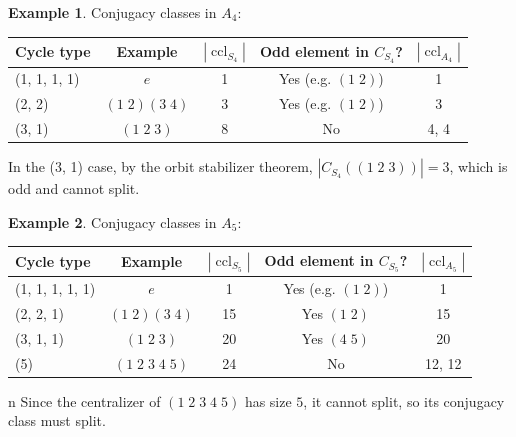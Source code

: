 \documentclass[a4paper]{article}
\theoremstyle{definition}
\newtheorem*{eg}{Example}
\DeclareMathOperator\ccl{ccl}
\begin{document}
\begin{eg}
  Conjugacy classes in $A_4$:\vspace{4pt}                                                         \\
  \begin{tabular}{lcccc}
    \toprule
    Cycle type   & Example          & $|\ccl_{S_4}|$ & Odd element in $C_{S_4}$? & $|\ccl_{A_4}|$ \\
    \midrule
    (1, 1, 1, 1) & $e$              & 1              & Yes (e.g. $(1\; 2)$)      & 1              \\
    (2, 2)       & $(1\; 2)(3\; 4)$ & 3              & Yes (e.g. $(1\; 2)$)      & 3              \\
    (3, 1)       & $(1\; 2\; 3)$    & 8              & No                        & 4, 4           \\
    \bottomrule
  \end{tabular}

  \vspace{4pt}
  \noindent In the (3, 1) case, by the orbit stabilizer theorem, $|C_{S_4}((1\; 2\; 3))| = 3$, which is odd and cannot split. 
\end{eg}

\begin{eg}
  Conjugacy classes in $A_5$:\vspace{4pt}                                                                 \\
  \begin{tabular}{lcccc}
    \toprule
    Cycle type      & Example               & $|\ccl_{S_5}|$ & Odd element in $C_{S_5}$? & $|\ccl_{A_5}|$ \\
    \midrule
    (1, 1, 1, 1, 1) & $e$                   & 1              & Yes (e.g. $(1\; 2)$)      & 1              \\
    (2, 2, 1)       & $(1\; 2)(3\; 4)$      & 15             & Yes $(1\; 2)$             & 15             \\
    (3, 1, 1)       & $(1\; 2\; 3)$         & 20             & Yes $(4\; 5)$             & 20             \\
    (5)             & $(1\; 2\; 3\; 4\; 5)$ & 24             & No                        & 12, 12         \\
    \bottomrule
  \end{tabular}
n
  Since the centralizer of $(1\; 2\; 3\; 4\; 5)$ has size $5$, it cannot split, so its conjugacy class must split.
\end{eg}
\end{document}
